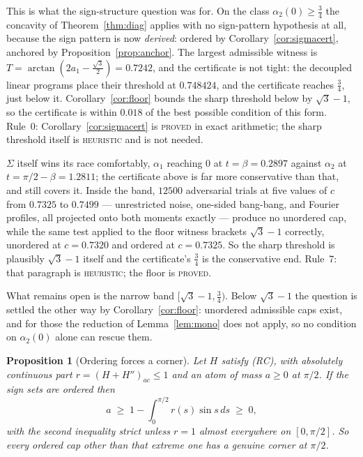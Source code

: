 \documentclass[11pt]{article}
\newtheorem{proposition}[theorem]{Proposition}
\theoremstyle{definition}
\newcommand{\Sig}{\Sigma}
\begin{document}
This is what the sign-structure question was for. On the class
$\alpha_2(0)\ge\tfrac34$ the concavity of Theorem~\ref{thm:diag} applies with no
sign-pattern hypothesis at all, because the sign pattern is now \emph{derived}: ordered by
Corollary~\ref{cor:sigmacert}, anchored by Proposition~\ref{prop:anchor}. The largest
admissible witness is $T=\arctan(2a_1-\tfrac{\sqrt3}2)=0.7242$, and the certificate is not
tight: the decoupled linear programs place their threshold at $0.748424$, and the certificate
reaches $\tfrac34$, just below it. Corollary~\ref{cor:floor} bounds the sharp threshold
below by $\sqrt3-1$, so the certificate is within $0.018$ of the best possible condition of
this form. Rule~0: 
Corollary~\ref{cor:sigmacert} is \textsc{proved} in exact arithmetic; the sharp threshold
itself is \textsc{heuristic} and is not needed.

$\Sig$ itself wins its race comfortably, $\alpha_1$ reaching $0$ at $t=\beta=0.2897$
against $\alpha_2$ at $t=\pi/2-\beta=1.2811$; the certificate above is far more
conservative than that, and still covers it. Inside the band, $12500$ adversarial trials at five values of $c$ from $0.7325$ to
$0.7499$ --- unrestricted noise, one-sided bang-bang, and Fourier profiles, all projected
onto both moments exactly --- produce no unordered cap, while the same test applied to the
floor witness brackets $\sqrt3-1$ correctly, unordered at $c=0.7320$ and ordered at
$c=0.7325$. So the sharp threshold is plausibly $\sqrt3-1$ itself and the certificate's
$\tfrac34$ is the conservative end. Rule~7: that paragraph is \textsc{heuristic}; the floor
is \textsc{proved}.

What remains open is the narrow band $[\sqrt3-1,\tfrac34)$. Below $\sqrt3-1$ the question
is settled the other way by Corollary~\ref{cor:floor}: unordered admissible caps exist, and
for those the reduction of Lemma~\ref{lem:mono} does not apply, so no condition on
$\alpha_2(0)$ alone can rescue them.

\begin{proposition}[Ordering forces a corner]\label{prop:corner}
Let $H$ satisfy (RC), with absolutely continuous part $r=(H+H'')_{ac}\le1$ and an atom of
mass $a\ge0$ at $\pi/2$. If the sign sets are ordered then
\[
  a \;\ge\; 1-\int_0^{\pi/2} r(s)\sin s\,ds \;\ge\; 0 ,
\]
with the second inequality strict unless $r=1$ almost everywhere on $[0,\pi/2]$. So every
ordered cap other than that extreme one has a genuine corner at $\pi/2$.
\end{proposition}
\end{document}
